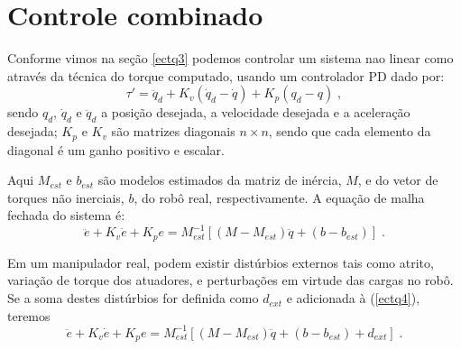 \section{Controle combinado}
Conforme vimos na seção \ref{ectq3} podemos controlar um sistema nao linear como  através da técnica do torque computado, usando um controlador PD dado por:
\begin{equation} \label{ectq3}
\tau'=\ddot{q}_d+K_v(\dot{q}_d-\dot{q})+K_p(q_d-q) \; ,
\end{equation}
sendo $q_{d}$, $\dot{q}_{d}$ e $\ddot{q}_{d}$ a posição desejada, a velocidade desejada e a aceleração desejada; $K_p$
e $K_v$ são matrizes diagonais $n \times n$, sendo que cada elemento da diagonal é um ganho positivo e escalar.

Aqui $M_{est}$ e $b_{est}$ são modelos estimados da matriz de inércia, $M$, e do vetor de torques não inerciais, $b$, do robô real,  respectivamente. A equação de malha fechada do sistema é:
\begin{equation} \label{ectq4}
\ddot{e}+K_v\dot{e}+K_pe=M_{est}^{-1}[(M-M_{est})\ddot{q}+(b-b_{est})] \; .
\end{equation}

Em um manipulador real, podem existir distúrbios externos tais como atrito, variação de torque dos atuadores, e perturbações em virtude  das cargas no robô. Se a soma destes distúrbios for definida como $d_{ext}$ e adicionada à (\ref{ectq4}), teremos
\begin{equation} \label{ectq5}
\ddot{e}+K_v\dot{e}+K_pe=M_{est}^{-1}[(M-M_{est})\ddot{q}+(b-b_{est})+d_{ext}] \; .
\end{equation}


